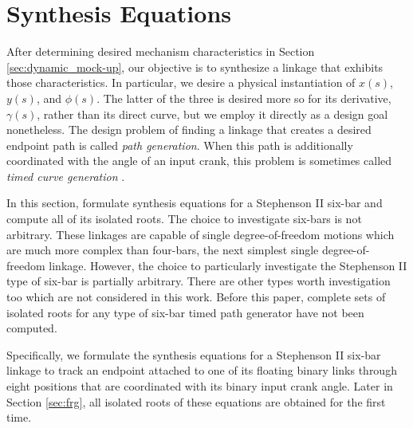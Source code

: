 \documentclass[journal]{IEEEtran}
\begin{document}
\section{Synthesis Equations}
\label{sec:synth_eq}

After determining desired mechanism characteristics in Section \ref{sec:dynamic_mock-up}, our objective is to synthesize a linkage that exhibits those characteristics.
In particular, we desire a physical instantiation of $x(s)$, $y(s)$, and $\phi(s)$.
The latter of the three is desired more so for its derivative, $\gamma(s)$, rather than its direct curve, but we employ it directly as a design goal nonetheless.
The design problem of finding a linkage that creates a desired endpoint path is called \textit{path generation}.
When this path is additionally coordinated with the angle of an input crank, this problem is sometimes called \textit{timed curve generation} \cite{dijksmanMotionGeometryMechanisms1976}.



In this section, formulate synthesis equations for a Stephenson II six-bar and compute all of its isolated roots.  The choice to investigate six-bars is not arbitrary.  These linkages are capable of single degree-of-freedom motions which are much more complex than four-bars, the next simplest single degree-of-freedom linkage.  However, the choice to particularly investigate the Stephenson II type of six-bar is partially arbitrary.  There are other types worth investigation too which are not considered in this work.  Before this paper, complete sets of isolated roots for any type of six-bar timed path generator have not been computed.


Specifically, we formulate the synthesis equations for a Stephenson II six-bar linkage to track an endpoint attached to one of its floating binary links through eight positions that are coordinated with its binary input crank angle.
Later in Section \ref{sec:frg}, all isolated roots of these equations are obtained for the first time.
\end{document}
